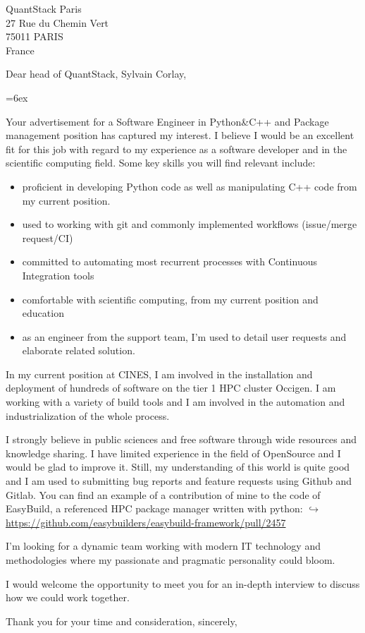 \documentclass[10pt,a4paper]{lettre}
\begin{document}
\begin{letter}{QuantStack Paris\\27 Rue du Chemin Vert\\75011 PARIS\\France}
\address{Victor Cameo Ponz\\3 rue Tour Gayraud\\34 070 Montpellier}
\nofax

\opening{Dear head of QuantStack, Sylvain Corlay,}

\parindent=6ex

Your advertisement for a Software Engineer in Python\&C++ and Package
management position has captured my interest. I believe I would be an excellent
fit for this job with regard to my experience as a software developer and in the
scientific computing field. Some key skills you will find relevant include:

\begin{itemize}
    \item proficient in developing Python code as well as manipulating C++ code from my
current position.
    \item used to working with git and commonly implemented workflows (issue/merge
request/CI)
    \item committed to automating most recurrent processes with Continuous Integration
tools
    \item comfortable with scientific computing, from my current position and education
    \item as an engineer from the support team, I'm used to detail user requests and
elaborate related solution.
\end{itemize}


In my current position at CINES, I am involved in the installation and deployment
of hundreds of software on the tier 1 HPC cluster Occigen. I am working with
a variety of build tools and I am involved in the automation and industrialization
of the whole process.

I strongly believe in public sciences and free software through wide resources and
knowledge sharing. I have limited experience in the field of OpenSource and I
would be glad to improve it. Still, my understanding of this world is quite good
and I am used to submitting bug reports and feature requests using Github and Gitlab.
You can find an example of a contribution of mine to the code of EasyBuild, a
referenced HPC package manager written with python:
\href{https://github.com/easybuilders/easybuild-framework/pull/2457}
{$\hookrightarrow$ https://github.com/easybuilders/easybuild-framework/pull/2457}

I'm looking for a dynamic team working with modern IT technology and
methodologies where my passionate and pragmatic personality could bloom.

I would welcome the opportunity to meet you for an in-depth interview to discuss
how we could work together.

\closing{Thank you for your time and consideration, sincerely,}
\end{letter}
\end{document}
